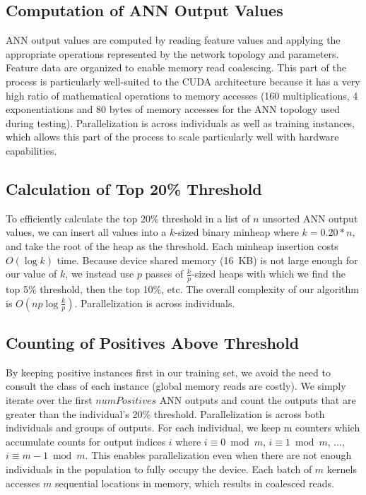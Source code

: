 \documentclass[11pt]{article}       %
\begin{document}
\subsection{Computation of ANN Output Values} \label{implementation}
ANN output values are computed by reading feature values and applying the appropriate operations represented by the network topology and parameters. Feature data are organized to enable memory read coalescing. This part of the process is particularly well-suited to the CUDA architecture because it has a very high ratio of mathematical operations to memory accesses (160 multiplications, 4 exponentiations and 80 bytes of memory accesses for the ANN topology used during testing). Parallelization is across individuals as well as training instances, which allows this part of the process to scale particularly well with hardware capabilities.

\subsection{Calculation of Top 20\% Threshold} \label{implementation}
To efficiently calculate the top 20\% threshold in a list of $n$ unsorted ANN output values, we can insert all values into a $k$-sized binary minheap where $k = 0.20 * n$, and take the root of the heap as the threshold. Each minheap insertion costs $O(\log k)$ time. Because device shared memory (16~KB) is not large enough for our value of $k$, we instead use $p$ passes of $\frac{k}{p}$-sized heaps with which we find the top 5\% threshold, then the top 10\%, etc. The overall complexity of our algorithm is $O(np \log \frac{k}{p})$. Parallelization is across individuals.

\subsection{Counting of Positives Above Threshold} \label{implementation}
By keeping positive instances first in our training set, we avoid the need to consult the class of each instance (global memory reads are costly). We simply iterate over the first $numPositives$ ANN outputs and count the outputs that are greater than the individual's 20\% threshold. Parallelization is across both individuals and groups of outputs. For each individual, we keep m counters which accumulate counts for output indices $i$ where $i \equiv 0 \bmod{m}$, $i \equiv 1 \bmod{m}$, ..., $i \equiv m - 1 \bmod{m}$. This enables parallelization even when there are not enough individuals in the population to fully occupy the device. Each batch of $m$ kernels accesses $m$ sequential locations in memory, which results in coalesced reads.
\end{document}
